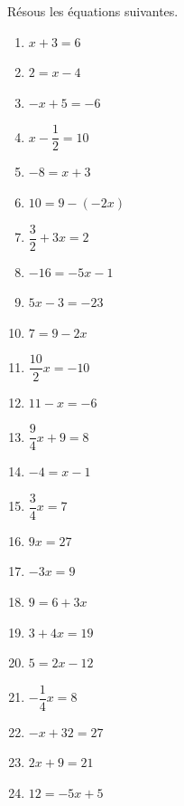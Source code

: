 \documentclass[parskip=half-]{scrartcl}
\begin{document}
\begin{exercise}
    Résous les équations suivantes.
    \begin{enumerate}[cols=3, itemsep=0.4cm]
        \item \(x + 3 = 6\)
        \item \(2=x-4\)
        \item \(-x + 5 = -6\)
        \item \(x - \dfrac{1}{2} = 10\)
        \item \(-8=x + 3\)
        \item \(10=9-(-2x)\)
        \item \(\dfrac{3}{2}+3x=2\)
        \item \(-16=-5x-1\)
        \item \(5x-3=-23\)
        \item \(7=9-2x\)
        \item \(\dfrac{10}{2} x  = -10\)
        \item \(11- x = -6\)
        \item \(\dfrac{9}{4} x+9=8\)
        \item \(-4=x - 1\)
        \item \(\dfrac{3}{4} x=7\)
        \item \(9x=27\)
        \item \(-3x=9\)
        \item \(9=6+3x\)
        \item \(3+4x=19\)
        \item \(5=2x-12\)
        \item \(-\dfrac{1}{4} x = 8\)
        \item \(-x+32=27\)
        \item \(2x+9=21\)
        \item \(12=-5x+ 5\)
    \end{enumerate}
\end{exercise}
\end{document}
